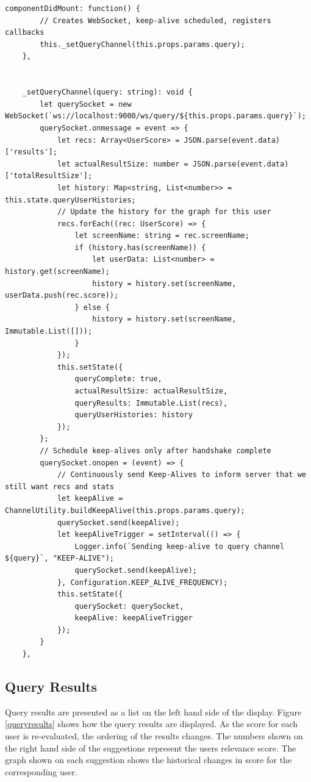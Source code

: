 \documentclass{l4proj}
\begin{document}
\begin{lstlisting}[caption=The method called by React when a new component mounts.,label=code:setquerychannel]
    componentDidMount: function() {
        // Creates WebSocket, keep-alive scheduled, registers callbacks
        this._setQueryChannel(this.props.params.query);
    },


    _setQueryChannel(query: string): void {
        let querySocket = new WebSocket(`ws://localhost:9000/ws/query/${this.props.params.query}`);
        querySocket.onmessage = event => {
            let recs: Array<UserScore> = JSON.parse(event.data)['results'];
            let actualResultSize: number = JSON.parse(event.data)['totalResultSize'];
            let history: Map<string, List<number>> = this.state.queryUserHistories;
            // Update the history for the graph for this user
            recs.forEach((rec: UserScore) => {
                let screenName: string = rec.screenName;
                if (history.has(screenName)) {
                    let userData: List<number> = history.get(screenName);
                    history = history.set(screenName, userData.push(rec.score));
                } else {
                    history = history.set(screenName, Immutable.List([]));
                }
            });
            this.setState({
                queryComplete: true,
                actualResultSize: actualResultSize,
                queryResults: Immutable.List(recs),
                queryUserHistories: history
            });
        };
        // Schedule keep-alives only after handshake complete
        querySocket.onopen = (event) => {
            // Continuously send Keep-Alives to inform server that we still want recs and stats
            let keepAlive = ChannelUtility.buildKeepAlive(this.props.params.query);
            querySocket.send(keepAlive);
            let keepAliveTrigger = setInterval(() => {
                Logger.info(`Sending keep-alive to query channel ${query}`, "KEEP-ALIVE");
                querySocket.send(keepAlive);
            }, Configuration.KEEP_ALIVE_FREQUENCY);
            this.setState({
                querySocket: querySocket,
                keepAlive: keepAliveTrigger
            });
        }
    },

\end{lstlisting}
        
        \subsection{Query Results}
        Query results are presented as a list on the left hand side of the display. Figure \ref{queryresults} shows how the query results are displayed. As the score for each user is re-evaluated, the ordering of the results changes. The numbers shown on the right hand side of the suggestions represent the users relevance score. The graph shown on each suggestion shows the historical changes in score for the corresponding user.
        
\end{document}
